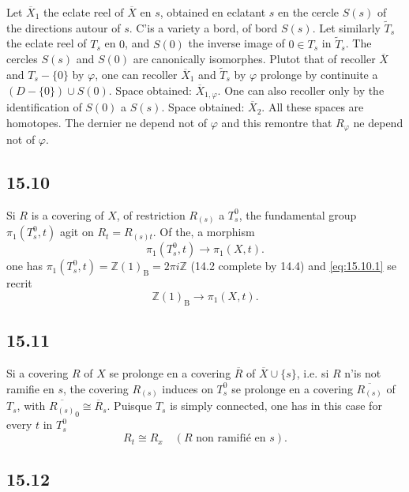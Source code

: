 \documentclass[12pt,a4paper]{article}
\theoremstyle{plain}
\theoremstyle{definition}
\theoremstyle{remark}
\newcommand{\bZ}{\mathbb{Z}}
\newcommand{\B}{\mathrm{B}}
\begin{document}
Let $\overline{X}_1$ the eclate reel of $\overline{X}$ en $s$, obtained en eclatant $s$ en the cercle $S(s)$ of the directions autour of $s$. C'is a variety a bord, of bord $S(s)$. Let similarly $\widetilde{T}_s$ the eclate reel of $T_s$ en $0$, and $S(0)$ the inverse image of $0 \in T_s$ in $\widetilde{T}_s$. The cercles $S(s)$ and $S(0)$ are canonically isomorphes. Plutot that of recoller $\overline{X}$ and $T_s - \{0\}$ by $\varphi$, one can recoller $\overline{X}_1$ and $\widetilde{T}_s$ by $\varphi$ prolonge by continuite a $(D - \{0\}) \cup S(0)$. Space obtained: $\overline{X}_{1,\varphi}$. One can also recoller only by the identification of $S(0)$ a $S(s)$. Space obtained: $\overline{X}_2$. All these spaces are homotopes. The dernier ne depend not of $\varphi$ and this remontre that $R_\varphi$ ne depend not of $\varphi$.

\subsection*{15.10}

Si $R$ is a covering of $X$, of restriction $R_{(s)}$ a $T_s^0$, the fundamental group $\pi_1(T_s^0, t)$ agit on $R_t = R_{(s)t}$. Of the, a morphism
\begin{equation}\label{eq:15.10.1}
\pi_1(T_s^0, t) \to \pi_1(X, t).
\end{equation}
one has $\pi_1(T_s^0, t) = \bZ(1)_{\B} = 2\pi i \bZ$ (14.2 complete by 14.4) and \eqref{eq:15.10.1} se recrit
\begin{equation}\label{eq:15.10.2}
\bZ(1)_{\B} \to \pi_1(X, t).
\end{equation}

\subsection*{15.11}

Si a covering $R$ of $X$ se prolonge en a covering $\overline{R}$ of $\overline{X} \cup \{s\}$, i.e. si $R$ n'is not ramifie en $s$, the covering $R_{(s)}$ induces on $T_s^0$ se prolonge en a covering $\overline{R_{(s)}}$ of $T_s$, with $\overline{R_{(s)}}_0 \cong \overline{R}_s$. Puisque $T_s$ is simply connected, one has in this case for every $t$ in $T_s^0$
\begin{equation}\label{eq:15.11.1}
R_t \cong R_x \quad (R \text{ non ramifié en } s).
\end{equation}

\subsection*{15.12}
\end{document}
